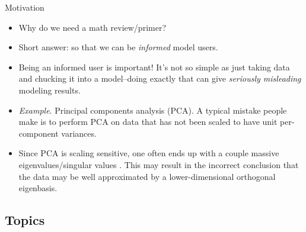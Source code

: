 \documentclass{beamer}
\begin{document}
\begin{frame}{Motivation}
    \begin{itemize}
        \item
        Why do we need a math review/primer?
        
        \item
        Short answer: so that we can be \textit{informed} model users.
        
        \item
        Being an informed user is important! It's not so simple as just taking
        data and chucking it into a model--doing exactly that can give
        \textit{seriously misleading} modeling results.

        \item
        \textit{Example}. Principal components analysis (PCA). A typical
        mistake people make\footnotemark{} is to perform PCA on data that has not been scaled to have unit
        per-component variances.

        \item
        Since PCA is scaling sensitive, one often ends up with a couple massive
        eigenvalues/singular values \footnotemark{}. This may result in the incorrect conclusion that the data may be
        well approximated by a lower-dimensional orthogonal eigenbasis.

        \medskip
    \end{itemize}
\end{frame}

\subsection{Topics}
\end{document}
